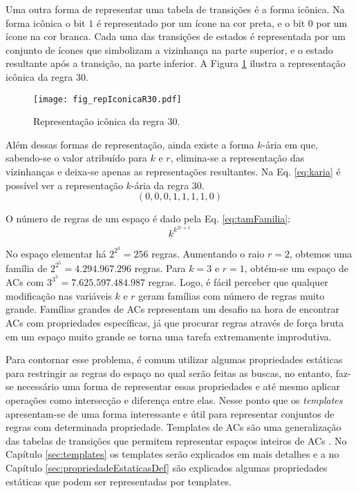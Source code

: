 Uma outra forma de representar uma tabela de transições é a forma icônica. Na forma icônica o bit $1$ é representado por um ícone na cor preta, e o bit $0$ por um ícone na cor branca. Cada uma das transições de estados é representada por um conjunto de ícones que simbolizam a vizinhança na parte superior, e o estado resultante após a transição, na parte inferior. A Figura \ref{fig:repIconicaR30} ilustra a representação icônica da regra 30.
	\begin{figure}[h!]
	  \centering
	  \texttt{[image: fig\_repIconicaR30.pdf]}
	  \caption{Representação icônica da regra 30.}
	  \label{fig:repIconicaR30}
	\end{figure}

Além dessas formas de representação, ainda existe a forma $k$-ária em que, sabendo-se o valor atribuído para $k$ e $r$, elimina-se a representação das vizinhanças e deixa-se apenas as representações resultantes. Na Eq. \eqref{eq:karia} é possível ver a representação $k$-ária da regra 30. %
	\begin{equation}
	(0,0,0,1,1,1,1,0)
	\label{eq:karia}
	\end{equation}

O número de regras de um espaço é dado pela Eq. \eqref{eq:tamFamilia}:%
	\begin{equation}
	k^{k^{2r+1}}
	\label{eq:tamFamilia}
	\end{equation}

No espaço elementar há $2^{2^{3}} = 256$ regras. Aumentando o raio $r=2$, obtemos uma família de $2^{2^{5}} = 4.294.967.296$ regras. Para $k=3$ e $r=1$, obtém-se um espaço de ACs com $3^{3^{3}} = 7.625.597.484.987$ regras. Logo, é fácil perceber que qualquer modificação nas variáveis $k$ e $r$ geram famílias com número de regras muito grande. %
Famílias grandes de ACs representam um desafio na hora de encontrar ACs com propriedades específicas, já que procurar regras através de força bruta em um espaço muito grande se torna uma tarefa extremamente improdutiva. %

Para contornar esse problema, é comum utilizar algumas propriedades estáticas para restringir as regras do espaço no qual serão feitas as buscas, no entanto,  faz-se necessário uma forma de representar essas propriedades e até mesmo aplicar operações como intersecção e diferença entre elas. Nesse ponto que os \textit{templates} apresentam-se de uma forma interessante e útil para representar conjuntos de regras com determinada propriedade. Templates de ACs são uma generalização das tabelas de transições que permitem representar espaços inteiros de ACs \cite{Verardo2014}. No Capítulo \ref{sec:templates} os templates serão explicados em mais detalhes e a no Capítulo \ref{sec:propriedadeEstaticasDef} são explicados algumas propriedades estáticas que podem ser representadas por templates. %